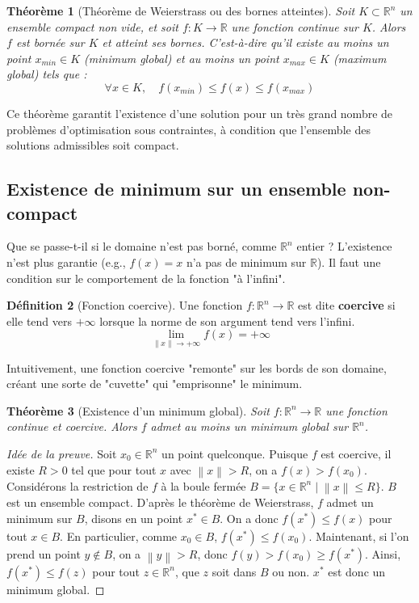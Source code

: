 \documentclass[a4paper,12pt,openany]{book}
\theoremstyle{plain}
\newtheorem{theorem}{Théorème}[section]
\theoremstyle{definition}
\newtheorem{definition}[theorem]{Définition}
\theoremstyle{remark}
\theoremstyle{nbstyle}
\newcommand{\R}{\mathbb{R}}
\newcommand{\norm}[1]{\left\lVert#1\right\rVert}
\begin{document}
	\begin{theorem}[Théorème de Weierstrass ou des bornes atteintes]
		Soit $K \subset \R^n$ un ensemble compact non vide, et soit $f: K \to \R$ une fonction continue sur $K$.
		Alors $f$ est bornée sur $K$ et atteint ses bornes. C'est-à-dire qu'il existe au moins un point $x_{min} \in K$ (minimum global) et au moins un point $x_{max} \in K$ (maximum global) tels que :
		$$ \forall x \in K, \quad f(x_{min}) \le f(x) \le f(x_{max}) $$
	\end{theorem}
	Ce théorème garantit l'existence d'une solution pour un très grand nombre de problèmes d'optimisation sous contraintes, à condition que l'ensemble des solutions admissibles soit compact.
	
	\subsection{Existence de minimum sur un ensemble non-compact}
	
	Que se passe-t-il si le domaine n'est pas borné, comme $\R^n$ entier ? L'existence n'est plus garantie (e.g., $f(x)=x$ n'a pas de minimum sur $\R$). Il faut une condition sur le comportement de la fonction "à l'infini".
	
	\begin{definition}[Fonction coercive]
		Une fonction $f: \R^n \to \R$ est dite \textbf{coercive} si elle tend vers $+\infty$ lorsque la norme de son argument tend vers l'infini.
		$$ \lim_{\norm{x} \to +\infty} f(x) = +\infty $$
	\end{definition}
	Intuitivement, une fonction coercive "remonte" sur les bords de son domaine, créant une sorte de "cuvette" qui "emprisonne" le minimum.
	
	\begin{theorem}[Existence d'un minimum global]
		Soit $f: \R^n \to \R$ une fonction continue et coercive. Alors $f$ admet au moins un minimum global sur $\R^n$.
	\end{theorem}
	
	\begin{proof}[Idée de la preuve]
		Soit $x_0 \in \R^n$ un point quelconque. Puisque $f$ est coercive, il existe $R > 0$ tel que pour tout $x$ avec $\norm{x} > R$, on a $f(x) > f(x_0)$.
		Considérons la restriction de $f$ à la boule fermée $B = \{x \in \R^n \mid \norm{x} \le R\}$.
		$B$ est un ensemble compact. D'après le théorème de Weierstrass, $f$ admet un minimum sur $B$, disons en un point $x^* \in B$.
		On a donc $f(x^*) \le f(x)$ pour tout $x \in B$. En particulier, comme $x_0 \in B$, $f(x^*) \le f(x_0)$.
		Maintenant, si l'on prend un point $y \notin B$, on a $\norm{y} > R$, donc $f(y) > f(x_0) \ge f(x^*)$.
		Ainsi, $f(x^*) \le f(z)$ pour tout $z \in \R^n$, que $z$ soit dans $B$ ou non. $x^*$ est donc un minimum global.
	\end{proof}
	
\end{document}

